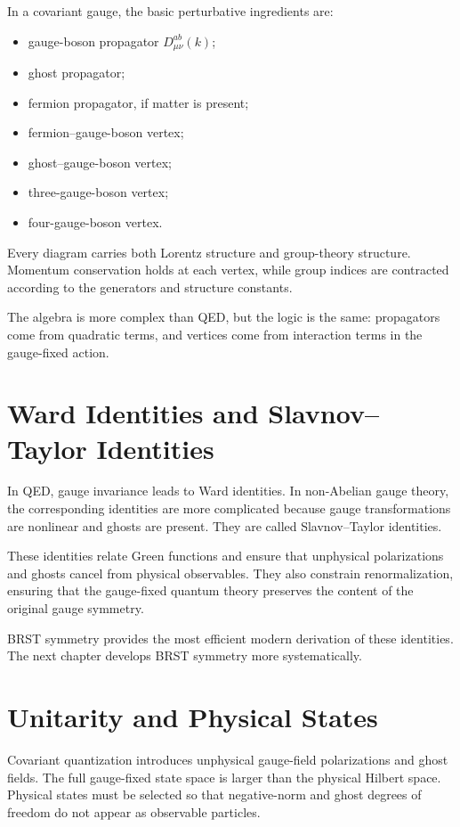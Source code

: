 In a covariant gauge, the basic perturbative ingredients are:
\begin{itemize}
    \item gauge-boson propagator \(D_{\mu\nu}^{ab}(k)\);
    \item ghost propagator;
    \item fermion propagator, if matter is present;
    \item fermion--gauge-boson vertex;
    \item ghost--gauge-boson vertex;
    \item three-gauge-boson vertex;
    \item four-gauge-boson vertex.
\end{itemize}
Every diagram carries both Lorentz structure and group-theory structure.
Momentum conservation holds at each vertex, while group indices are contracted
according to the generators and structure constants.

The algebra is more complex than QED, but the logic is the same: propagators come
from quadratic terms, and vertices come from interaction terms in the
gauge-fixed action.

\section{Ward Identities and Slavnov--Taylor Identities}

In QED, gauge invariance leads to Ward identities. In non-Abelian gauge theory,
the corresponding identities are more complicated because gauge transformations
are nonlinear and ghosts are present. They are called Slavnov--Taylor identities.

These identities relate Green functions and ensure that unphysical polarizations
and ghosts cancel from physical observables. They also constrain
renormalization, ensuring that the gauge-fixed quantum theory preserves the
content of the original gauge symmetry.

BRST symmetry provides the most efficient modern derivation of these identities.
The next chapter develops BRST symmetry more systematically.

\section{Unitarity and Physical States}

Covariant quantization introduces unphysical gauge-field polarizations and ghost
fields. The full gauge-fixed state space is larger than the physical Hilbert
space. Physical states must be selected so that negative-norm and ghost degrees
of freedom do not appear as observable particles.

